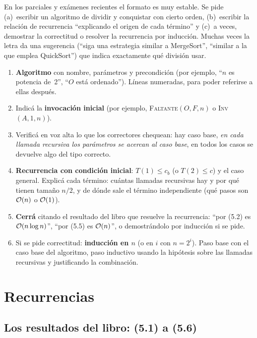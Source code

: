 En los parciales y exámenes recientes el formato es muy estable. Se pide (a)~escribir un algoritmo de dividir y conquistar con cierto orden, (b)~escribir la relación de recurrencia ``explicando el origen de cada término'' y (c)~a veces, demostrar la correctitud o resolver la recurrencia por inducción. Muchas veces la letra da una sugerencia (``siga una estrategia similar a MergeSort'', ``similar a la que emplea QuickSort'') que indica exactamente qué división usar.

\begin{receta}
\begin{enumerate}
  \item \textbf{Algoritmo} con nombre, parámetros y precondición (por ejemplo, ``$n$ es potencia de~2'', ``$O$ está ordenado''). Líneas numeradas, para poder referirse a ellas después.
  \item Indicá la \textbf{invocación inicial} (por ejemplo, \textsc{Faltante}$(O,F,n)$ o \textsc{Inv}$(A,1,n)$).
  \item Verificá en voz alta lo que los correctores chequean: hay caso base, \emph{en cada llamada recursiva los parámetros se acercan al caso base}, en todos los casos se devuelve algo del tipo correcto.
  \item \textbf{Recurrencia con condición inicial}: $T(1)\le c_b$ (o $T(2)\le c$) y el caso general. Explicá cada término: cuántas llamadas recursivas hay y por qué tienen tamaño $n/2$, y de dónde sale el término independiente (qué pasos son $\mathcal{O}(n)$ o $\mathcal{O}(1)$).
  \item \textbf{Cerrá} citando el resultado del libro que resuelve la recurrencia: ``por (5.2) es $\mathcal{O}(n\log n)$'', ``por (5.5) es $\mathcal{O}(n)$'', o demostrándolo por inducción si se pide.
  \item Si se pide correctitud: \textbf{inducción en $n$} (o en $i$ con $n=2^i$). Paso base con el caso base del algoritmo, paso inductivo usando la hipótesis sobre las llamadas recursivas y justificando la combinación.
\end{enumerate}
\end{receta}

\section{Recurrencias}

\subsection{Los resultados del libro: (5.1) a (5.6)}

